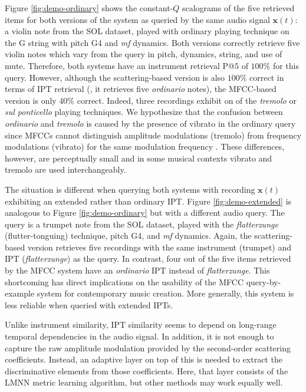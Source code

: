 Figure \ref{fig:demo-ordinary} shows the constant-$Q$ scalograms of the five retrieved items for both versions of the system as queried by the same audio signal $\boldsymbol{x}(t)$: a violin note from the SOL dataset, played with ordinary playing technique on the G string with pitch G4 and \emph{mf} dynamics.
Both versions correctly retrieve five violin notes which vary from the query in pitch, dynamics, string, and use of mute.
Therefore, both systems have an instrument retrieval P@$5$ of $100\%$ for this query.
However, although the scattering-based version is also $100\%$ correct in terms of IPT retrieval (\ie{}, it retrieves five \emph{ordinario} notes), the MFCC-based version is only $40\%$ correct.
Indeed, three recordings exhibit on of the \emph{tremolo} or \emph{sul ponticello} playing techniques.
We hypothesize that the confusion between \emph{ordinario} and \emph{tremolo} is caused by the presence of vibrato in the ordinary query since MFCCs cannot distinguish amplitude modulations (tremolo) from frequency modulations (vibrato) for the same modulation frequency \cite{anden2012dafx}.
These differences, however, are perceptually small and in some musical contexts vibrato and tremolo are used interchangeably.

The situation is different when querying both systems with recording $\boldsymbol{x}(t)$ exhibiting an extended rather than ordinary IPT.
Figure \ref{fig:demo-extended} is analogous to Figure \ref{fig:demo-ordinary} but with a different audio query.
The query is a trumpet note from the SOL dataset, played with the \emph{flatterzunge} (flutter-tonguing) technique, pitch G4, and \emph{mf} dynamics.
Again, the scattering-based version retrieves five recordings with the same instrument (trumpet) and IPT (\emph{flatterzunge}) as the query.
In contrast, four out of the five items retrieved by the MFCC system have an \emph{ordinario} IPT instead of \emph{flatterzunge}.
This shortcoming has direct implications on the usability of the MFCC query-by-example system for contemporary music creation.
More generally, this system is less reliable when queried with extended IPTs.

Unlike instrument similarity, IPT similarity seems to depend on long-range temporal dependencies in the audio signal.
In addition, it is not enough to capture the raw amplitude modulation provided by the second-order scattering coefficients.
Instead, an adaptive layer on top of this is needed to extract the discriminative elements from those coefficients.
Here, that layer consists of the LMNN metric learning algorithm, but other methods may work equally well.

